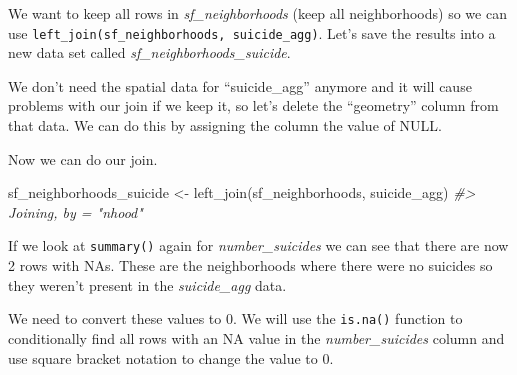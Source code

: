 \documentclass[
]{krantz}
\makeatletter
\newenvironment{Shaded}{\begin{snugshade}}{\end{snugshade}}
\newcommand{\CommentTok}[1]{\textcolor[rgb]{0.37,0.37,0.37}{\textit{#1}}}
\newcommand{\ConstantTok}[1]{\textcolor[rgb]{0,0,0}{#1}}
\newcommand{\DecValTok}[1]{\textcolor[rgb]{0.06,0.06,0.06}{#1}}
\newcommand{\FunctionTok}[1]{\textcolor[rgb]{0,0,0}{#1}}
\newcommand{\NormalTok}[1]{#1}
\newcommand{\OtherTok}[1]{\textcolor[rgb]{0.37,0.37,0.37}{#1}}
\newcommand{\SpecialCharTok}[1]{\textcolor[rgb]{0,0,0}{#1}}
\newenvironment{kframe}{%
\medskip{}
\setlength{\fboxsep}{.8em}
 \def\at@end@of@kframe{}%
 \ifinner\ifhmode%
  \def\at@end@of@kframe{\end{minipage}}%
  \begin{minipage}{\columnwidth}%
 \fi\fi%
 \def\FrameCommand##1{\hskip\@totalleftmargin \hskip-\fboxsep
 \colorbox{shadecolor}{##1}\hskip-\fboxsep
     \hskip-\linewidth \hskip-\@totalleftmargin \hskip\columnwidth}%
 \MakeFramed {\advance\hsize-\width
   \@totalleftmargin\z@ \linewidth\hsize
   \@setminipage}}%
 {\par\unskip\endMakeFramed%
 \at@end@of@kframe}
\renewenvironment{Shaded}{\begin{kframe}}{\end{kframe}}
\makeatother
\begin{document}
We want to keep all rows in \emph{sf\_neighborhoods} (keep all neighborhoods) so we can use \texttt{left\_join(sf\_neighborhoods,\ suicide\_agg)}. Let's save the results into a new data set called \emph{sf\_neighborhoods\_suicide}.

We don't need the spatial data for ``suicide\_agg'' anymore and it will cause problems with our join if we keep it, so let's delete the ``geometry'' column from that data. We can do this by assigning the column the value of NULL.

\begin{Shaded}
\end{Shaded}

Now we can do our join.

\begin{Shaded}
\begin{Highlighting}[]
\NormalTok{sf\_neighborhoods\_suicide }\OtherTok{\textless{}{-}} \FunctionTok{left\_join}\NormalTok{(sf\_neighborhoods, suicide\_agg)}
\CommentTok{\#\textgreater{} Joining, by = "nhood"}
\end{Highlighting}
\end{Shaded}

If we look at \texttt{summary()} again for \emph{number\_suicides} we can see that there are now 2 rows with NAs. These are the neighborhoods where there were no suicides so they weren't present in the \emph{suicide\_agg} data.

\begin{Shaded}
\end{Shaded}

We need to convert these values to 0. We will use the \texttt{is.na()} function to conditionally find all rows with an NA value in the \emph{number\_suicides} column and use square bracket notation to change the value to 0.

\begin{Shaded}
\end{Shaded}
\end{document}
